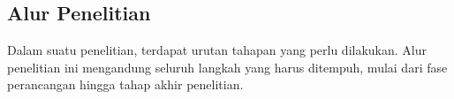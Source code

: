 \chapter{\babTiga}

\section{Alur Penelitian}
Dalam suatu penelitian, terdapat urutan tahapan yang perlu dilakukan. Alur penelitian ini mengandung seluruh langkah yang harus ditempuh, mulai dari fase perancangan hingga tahap akhir penelitian.
